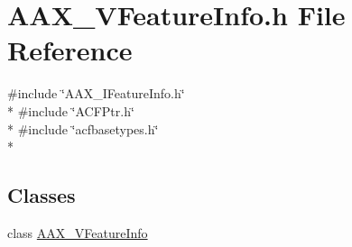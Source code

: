 \hypertarget{a00309}{}\section{A\+A\+X\+\_\+\+V\+Feature\+Info.\+h File Reference}
\label{a00309}
{\ttfamily \#include \char`\"{}A\+A\+X\+\_\+\+I\+Feature\+Info.\+h\char`\"{}}\\*
{\ttfamily \#include \char`\"{}A\+C\+F\+Ptr.\+h\char`\"{}}\\*
{\ttfamily \#include \char`\"{}acfbasetypes.\+h\char`\"{}}\\*
\subsection*{Classes}
\begin{DoxyCompactItemize}
\item 
class \hyperlink{a00135}{A\+A\+X\+\_\+\+V\+Feature\+Info}
\end{DoxyCompactItemize}
